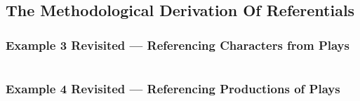 \subsection{The Methodological Derivation Of Referentials}
\subsubsection{Example 3 Revisited --- Referencing Characters from Plays}
\begin{worktt} 
\begin{equation*}

\end{equation*}
\end{worktt}

\subsubsection{Example 4 Revisited --- Referencing Productions of Plays}
